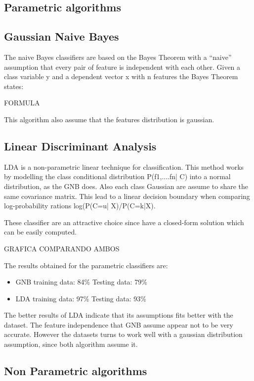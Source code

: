 \subsection{Parametric algorithms}

\subsection*{Gaussian Naive Bayes}

The naive Bayes classifiers are based on the Bayes Theorem with a “naive” assumption that every pair of feature is independent with each other. Given a class variable y and a dependent vector x with n features the Bayes Theorem states:\break

FORMULA

This algorithm also assume that the features distribution is gaussian.

\subsection*{Linear Discriminant Analysis}


LDA is a non-parametric linear technique for classification. This method works by modelling the class conditional distribution P(f1,....fn| C) into a normal distribution, as the GNB does. Also each class Gaussian are assume to share the same covariance matrix. This lead to a linear decision boundary when comparing log-probability rations log(P(C=u| X)/P(C=k|X).

These classifier are an attractive choice since have a closed-form solution which can be easily computed.

GRAFICA COMPARANDO AMBOS

The results obtained for the parametric classifiers are:

\begin{itemize}
\item GNB training data: 84\% Testing data: 79\% 
\item LDA training data: 97\% Testing data: 93\%
\end{itemize}

The better results of LDA indicate that its assumptions fits better with the dataset. The feature independence that GNB assume appear not to be very accurate. However the datasets turns to work well with a gaussian distribution assumption, since both algorithm assume it. 

\subsection{Non Parametric algorithms}

